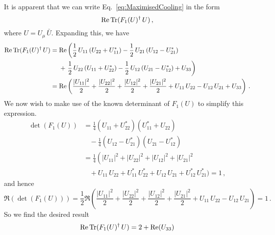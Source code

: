 It is apparent that we can write Eq.~\ref{eq:MaximisedCooling} in the form
\begin{equation}
\operatorname{Re}\operatorname{Tr}(F_1(U)^\dagger\, U)\, ,
\end{equation}
where $U = U_\mu\, \bar{U}$. Expanding this, we have
\begin{align*}
\operatorname{Re}\operatorname{Tr}(F_1(U)^\dagger\, U) &=\operatorname{Re} \left( \frac{1}{2}\,U_{11} \left(U_{22} + U_{11}^*\right) - \frac{1}{2}\,U_{21} \left(U_{12} - U_{21}^*\right)\right.\\
&~~~~+ \left. \frac{1}{2}\,U_{22} \left(U_{11} + U_{22}^*\right)
- \frac{1}{2}\,U_{12} \left(U_{21} - U_{12}^*\right) +U_{33}\right)\\
&= \operatorname{Re}\left(\frac{|U_{11}|^2}{2} + \frac{|U_{22}|^2}{2} + \frac{|U_{12}|^2}{2} + \frac{|U_{21}|^2}{2} + U_{11}\,U_{22} - U_{12}\,U_{21} + U_{33}\right)\, .
\end{align*}
We now wish to make use of the known determinant of $F_1(U)$ to simplify this expression.
\begin{align*}
\det(F_1(U)) &= \frac{1}{4} \left(U_{11}+ U_{22}^*\right)\left(U_{11}^* + U_{22}\right)\\
&~~~~-\frac{1}{4}\left(U_{12} - U_{21}^*\right)\left( U_{21} - U_{12}^*\right)\\
&=\frac{1}{4}\left( |U_{11}|^2 + |U_{22}|^2 + |U_{12}|^2 + |U_{21}|^2\right.\\
&~~~~+ U_{11}\,U_{22} + U_{11}^*\,U_{22}^* + U_{12}\,U_{21} + U_{12}^*\,U_{21}^*\big) = 1\, ,
\end{align*}
and hence
\begin{equation}
\Re(\det(F_1(U))) = \frac{1}{2}\Re\left(\frac{|U_{11}|^2}{2} + \frac{|U_{22}|^2}{2} + \frac{|U_{12}|^2}{2} + \frac{|U_{21}|^2}{2} + U_{11}\,U_{22} - U_{12}\,U_{21}\right) = 1\, .
\end{equation}
So we find the desired result
\begin{equation}
\operatorname{Re}\operatorname{Tr}(F_1(U)^\dagger\, U) = 2 + \operatorname{Re}(U_{33})
\end{equation}